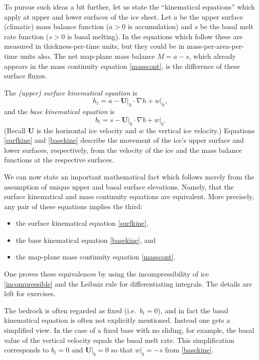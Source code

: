 \documentclass[letterpaper,final,12pt,reqno]{amsart}
\newcommand{\grad}{\nabla}
\begin{document}
To pursue such ideas a bit further, let us state the ``kinematical equations'' which apply at upper and lower surfaces of the ice sheet.  Let $a$ be the upper surface (climatic) mass balance function ($a>0$ is accumulation) and $s$ be the basal melt rate function ($s>0$ is basal melting).  In the equations which follow these are measured in thickness-per-time units, but they could be in mass-per-area-per-time units also.  The net map-plane mass balance $M=a-s$, which already appears in the mass continuity equation \eqref{masscont}, is the difference of these surface fluxes.

The \emph{(upper) surface kinematical equation} is 
\begin{equation}
h_t = a - \mathbf{U}\big|_h \cdot \grad h + w\big|_h,  \label{surfkine}
\end{equation}
and the \emph{base kinematical equation} is
\begin{equation}
b_t = s - \mathbf{U}\big|_b \cdot \grad b + w\big|_b.  \label{basekine}
\end{equation}
(Recall $\mathbf{U}$ is the horizontal ice velocity and $w$ the vertical ice velocity.)  Equations \eqref{surfkine} and \eqref{basekine} describe the movement of the ice's upper surface and lower surfaces, respectively, from the velocity of the ice and the mass balance functions at the respective surfaces.

We can now state an important mathematical fact which follows merely from the assumption of unique upper and basal surface elevations.  Namely, that the surface kinematical and mass continuity equations are equivalent.  More precisely, any pair of these equations implies the third:
  \begin{itemize}
  \item the surface kinematical equation \eqref{surfkine},
  \item the base kinematical equation \eqref{basekine}, and
  \item the map-plane mass continuity equation \eqref{masscont}.
  \end{itemize}
One proves these equivalences by using the incompressibility of ice \eqref{incompressible} and the Leibniz rule for differentiating integrals.  The details are left for exercises.

The bedrock is often regarded as fixed (i.e.~$b_t=0$), and in fact the basal kinematical equation is often not explicitly mentioned.  Instead one gets a simplified view.  In the case of a fixed base with no sliding, for example, the basal value of the vertical velocity equals the basal melt rate.  This simplification corresponds to $b_t=0$ and $\mathbf{U}\big|_b=0$ so that $w\big|_b=-s$ from \eqref{basekine}.
\end{document}
